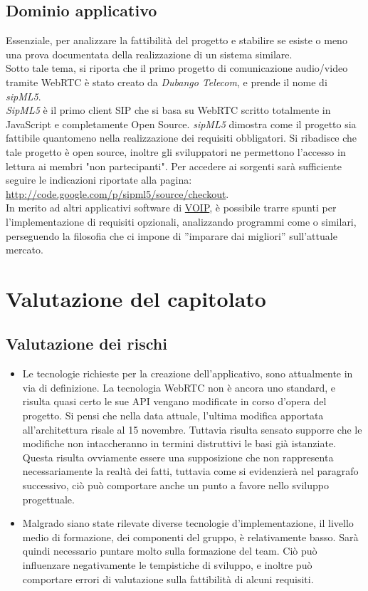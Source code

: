 \subsection{Dominio applicativo}
Essenziale, per analizzare la fattibilità del progetto e stabilire se esiste o meno una prova documentata della realizzazione di un sistema similare.\\ Sotto tale tema, si riporta che il primo progetto di comunicazione audio/video tramite WebRTC è stato creato da \textit{Dubango Telecom}, e prende il nome di \textit{sipML5}.\\ \textit{SipML5} è il primo client SIP che si basa su WebRTC scritto totalmente in JavaScript e completamente Open Source. \textit{sipML5} dimostra come il progetto sia fattibile quantomeno nella realizzazione dei requisiti obbligatori. Si ribadisce che tale progetto è open source, inoltre gli sviluppatori ne permettono l'accesso in lettura ai membri "non partecipanti". Per accedere ai sorgenti sarà sufficiente seguire le indicazioni riportate alla pagina: \url{http://code.google.com/p/sipml5/source/checkout}.\\In merito ad altri applicativi software di \underline{VOIP}, è possibile trarre spunti per l'implementazione di requisiti opzionali, analizzando programmi come  o similari, perseguendo la filosofia che ci impone di ''imparare dai migliori'' sull'attuale mercato.
\clearpage
\section{Valutazione del capitolato}

\subsection{Valutazione dei rischi}
\begin{itemize}
	\item Le tecnologie richieste per la creazione dell'applicativo, sono attualmente in via di definizione. La tecnologia WebRTC non è ancora uno standard, e risulta quasi certo le sue API vengano modificate in corso d'opera del progetto. Si pensi che nella data attuale, l'ultima modifica apportata all'architettura risale al 15 novembre. Tuttavia risulta sensato supporre che le modifiche non intaccheranno in termini distruttivi le basi già istanziate. Questa risulta ovviamente essere una supposizione che non rappresenta necessariamente la realtà dei fatti, tuttavia come si evidenzierà nel paragrafo successivo, ciò può comportare anche un punto a favore nello sviluppo progettuale.
	\item Malgrado siano state rilevate diverse tecnologie d'implementazione, il livello medio di formazione, dei componenti del gruppo, è relativamente basso. Sarà quindi necessario puntare molto sulla formazione del team. Ciò può influenzare negativamente le tempistiche di sviluppo, e inoltre può comportare errori di valutazione sulla fattibilità di alcuni requisiti.
\end{itemize}

